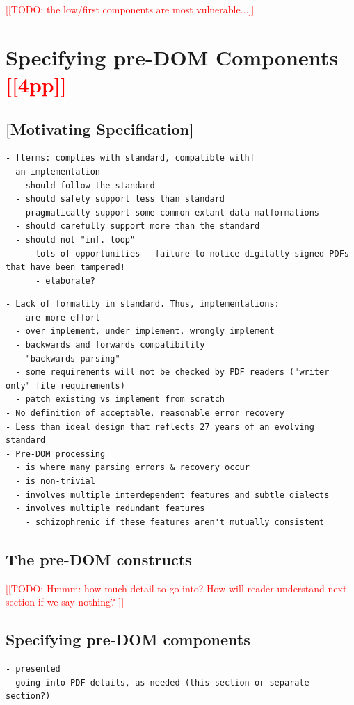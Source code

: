 \documentclass[conference,12pt]{IEEEtran}
\newcommand{\note}[1]{\noteYes{#1}}
\newcommand{\noteYes}[1]{\textcolor{red}{[[#1]]}}
\newcommand{\todo}[1]{\note{TODO: #1}}
\begin{document}
\todo{the low/first components are most vulnerable...}
     

\section{Specifying pre-DOM Components \note{4pp}}
\label{sec:specifying}

\subsection{[Motivating Specification]}
\begin{lstlisting}[style=meta]
- [terms: complies with standard, compatible with]
- an implementation
  - should follow the standard
  - should safely support less than standard
  - pragmatically support some common extant data malformations
  - should carefully support more than the standard
  - should not "inf. loop"
    - lots of opportunities - failure to notice digitally signed PDFs that have been tampered! 
      - elaborate?
\end{lstlisting}

\begin{lstlisting}[style=meta]
- Lack of formality in standard. Thus, implementations:
  - are more effort
  - over implement, under implement, wrongly implement
  - backwards and forwards compatibility
  - "backwards parsing"
  - some requirements will not be checked by PDF readers ("writer only" file requirements) 
  - patch existing vs implement from scratch
- No definition of acceptable, reasonable error recovery
- Less than ideal design that reflects 27 years of an evolving standard
- Pre-DOM processing
  - is where many parsing errors & recovery occur
  - is non-trivial
  - involves multiple interdependent features and subtle dialects
  - involves multiple redundant features
    - schizophrenic if these features aren't mutually consistent
\end{lstlisting}

\subsection{The pre-DOM constructs}
\todo{Hmmm: how much detail to go into?
      How will reader understand next section if we say nothing?
}

\subsection{Specifying pre-DOM components}
\begin{lstlisting}[style=meta]
- presented
- going into PDF details, as needed (this section or separate section?)
\end{lstlisting}
\end{document}
